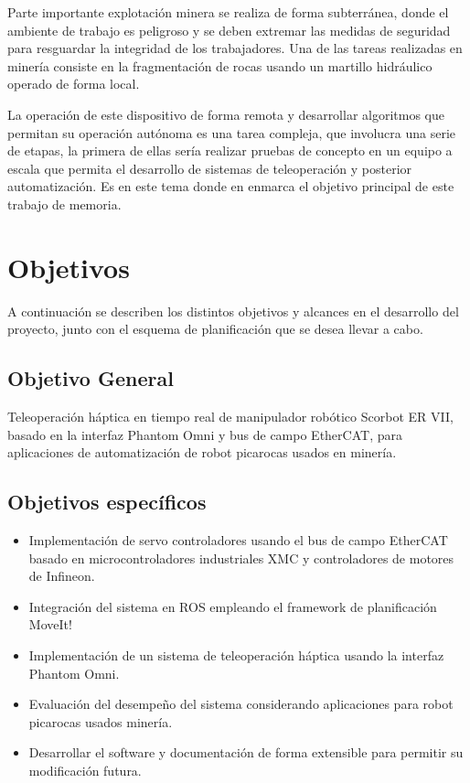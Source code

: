 Parte importante explotación minera se realiza de forma subterránea, donde el ambiente de trabajo es peligroso y se deben extremar las medidas de seguridad para resguardar la integridad de los trabajadores. Una de las tareas realizadas en minería consiste en la fragmentación de rocas usando un martillo hidráulico operado de forma local.

La operación de este dispositivo de forma remota y desarrollar algoritmos que permitan su operación autónoma es una tarea compleja, que involucra una serie de etapas, la primera de ellas sería realizar pruebas de concepto en un equipo a escala que permita el desarrollo de sistemas de teleoperación y posterior automatización. Es en este tema donde en enmarca el objetivo principal de este trabajo de memoria.

\section{Objetivos}

A continuación se describen los distintos objetivos y alcances en el desarrollo del proyecto, junto con el esquema de planificación que se desea llevar a cabo.

\subsection{Objetivo General}

Teleoperación háptica en tiempo real de manipulador robótico Scorbot ER VII, basado en la interfaz Phantom Omni y bus de campo EtherCAT, para aplicaciones de automatización de robot picarocas usados en minería.

\subsection{Objetivos específicos}

\begin{itemize}

\item Implementación de servo controladores usando el bus de campo EtherCAT basado en microcontroladores industriales XMC y controladores de motores de Infineon.

\item Integración del sistema en ROS empleando el framework de planificación MoveIt!

\item Implementación de un sistema de teleoperación háptica usando la interfaz Phantom Omni.

\item Evaluación del desempeño del sistema considerando aplicaciones para robot picarocas usados minería.

\item Desarrollar el software y documentación de forma extensible para permitir su modificación futura.

\end{itemize}


